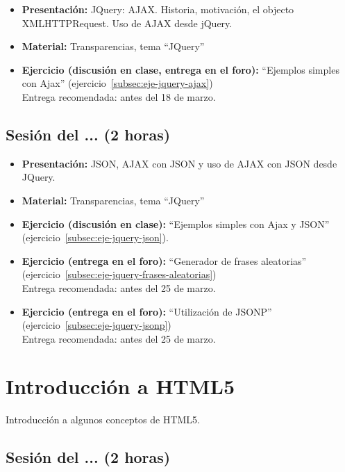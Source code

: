 \documentclass[a4paper,12pt]{report}
\begin{document}
\begin{itemize}
\item \textbf{Presentación:} JQuery: AJAX. Historia, motivación, el objecto XMLHTTPRequest. Uso de AJAX desde jQuery.
\item \textbf{Material:} Transparencias, tema ``JQuery''
\item \textbf{Ejercicio (discusión en clase, entrega en el foro):} ``Ejemplos simples con Ajax'' (ejercicio~\ref{subsec:eje-jquery-ajax}) \\
  Entrega recomendada: antes del 18 de marzo.
\end{itemize}

\subsection{Sesión del ... (2 horas)}

\begin{itemize}
\item \textbf{Presentación:} JSON, AJAX con JSON y uso de AJAX con JSON desde JQuery.
\item \textbf{Material:} Transparencias, tema ``JQuery''
\item \textbf{Ejercicio (discusión en clase):} ``Ejemplos simples con Ajax y JSON'' (ejercicio~\ref{subsec:eje-jquery-json}).
\item \textbf{Ejercicio (entrega en el foro):} ``Generador de frases aleatorias'' (ejercicio~\ref{subsec:eje-jquery-frases-aleatorias}) \\
  Entrega recomendada: antes del 25 de marzo.
\item \textbf{Ejercicio (entrega en el foro):} ``Utilización de JSONP'' (ejercicio~\ref{subsec:eje-jquery-jsonp}) \\
  Entrega recomendada: antes del 25 de marzo.
\end{itemize}


\section{Introducción a HTML5}

Introducción a algunos conceptos de HTML5.

\subsection{Sesión del ... (2 horas)}
\end{document}
